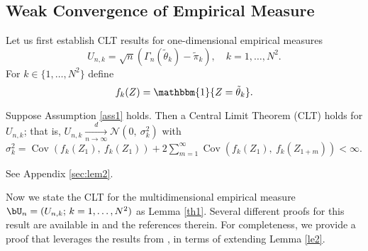 \documentclass[10pt, twocolumn]{IEEEtran}
\begin{document}
\subsection{Weak Convergence of Empirical Measure}
\label{WeakConvergenceOfUn}

Let us first establish CLT results for one-dimensional empirical measures
\begin{equation}
  U_{n,k} = \sqrt n ( {{\Gamma
        _n}( {{{\tilde {\theta}}_k}} ) - {{\tilde \pi }_k}}), 
\quad k = 1, \ldots ,{N^2}.
\label{2.1}
\end{equation}
For $k \in \{1,\ldots,N^2\}$ define
\begin{equation}
{f_k}( Z ) = \mathbbm{1}\{ {Z = {{\tilde {\theta}}_k}}
  \}.  
\label{998}
\end{equation}

\begin{lemma} \label{le2} Suppose Assumption \ref{ass1} holds. Then a
  Central Limit Theorem (CLT) holds for $U_{n,k}$; that is,
  $U_{n,k}\xrightarrow[{n \to \infty }]{{\textit{d}}}\mathcal{N}(
    {0,~\sigma _k^2})$ with $\sigma _k^2 = \operatorname{Cov}
  ( {{f_k} ( {{Z_1}}),~{f_k}( {{Z_1}})}
  ) + 2\sum_{m = 1}^\infty {\operatorname{Cov} } (
    {{f_k}( {{Z_1}} ),~{f_k}( {{Z_{1 + m}}} )}) < \infty$.
\end{lemma}
\begin{IEEEproof}
See Appendix \ref{sec:lem2}.
\end{IEEEproof}


{Now we state the CLT \cite[Thm. 3.1]{billingsley1961statisticala} for the multidimensional
empirical measure $\bU_n = (U_{n,k};\,k=1,\ldots,N^2)$ as Lemma \ref{th1}. Several different proofs for this result are available in \cite{billingsley1961statisticala} and the references therein. For completeness, we provide a proof that leverages the results from \cite{jones2004markov}, in terms of extending Lemma \ref{le2}.}
\end{document}
